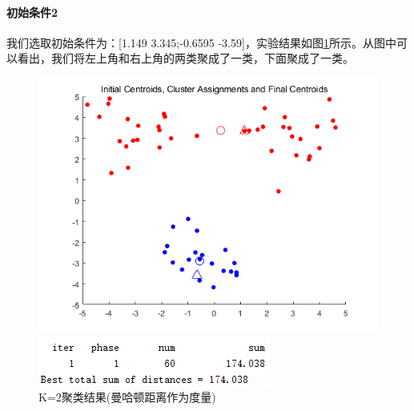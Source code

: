 \documentclass[cn]{elegantbook}
\begin{document}
\paragraph{初始条件2}
我们选取初始条件为：[1.149 3.345;-0.6595 -3.59]，实验结果如图\ref{res22}所示。从图中可以看出，我们将左上角和右上角的两类聚成了一类，下面聚成了一类。
\begin{figure}[!h]
	\centering
	\begin{minipage}{0.48\linewidth}
		\centering
		\includegraphics[width=\linewidth]{images/res22}
	\end{minipage}
	\begin{minipage}{0.48\linewidth}
		\centering
		\includegraphics[width=\linewidth]{images/res221}
	\end{minipage}
	\caption{\label{res22}K=2聚类结果(曼哈顿距离作为度量)}
\end{figure}
\end{document}

